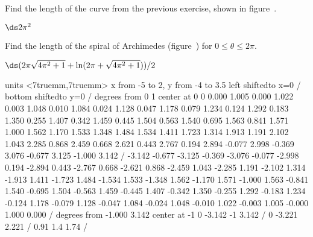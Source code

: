 \begin{exercises}
\begin{exercise} Find the length of the curve from the previous exercise,
shown in figure~.
\begin{answer} $\ds 2\pi^2$
\end{answer}\end{exercise}

\begin{exercise} Find the length of the spiral of Archimedes
(figure~) for $0\le\theta\le2\pi$.
\begin{answer} $\ds(2\pi\sqrt{4\pi^2+1}+\ln(2\pi+\sqrt{4\pi^2+1}))/2$
\end{answer}\end{exercise}

\figure
\vbox{\beginpicture
\normalgraphs
\sevenpoint
\setcoordinatesystem units <7truemm,7truemm>
\setplotarea x from -5 to 2, y from -4  to 3.5
\axis left shiftedto x=0 /
\axis bottom shiftedto y=0 /
 degrees from 0 1 center at 0 0
\setquadratic
\textRed
{} 0.000 1.005 0.000 1.022 0.003 1.048 0.010 1.084 0.024
1.128 0.047 1.178 0.079 1.234 0.124 1.292 0.183 1.350 0.255
1.407 0.342 1.459 0.445 1.504 0.563 1.540 0.695 1.563 0.841
1.571 1.000 1.562 1.170 1.533 1.348 1.484 1.534 1.411 1.723
1.314 1.913 1.191 2.102 1.043 2.285 0.868 2.459 0.668 2.621
0.443 2.767 0.194 2.894 -0.077 2.998 -0.369 3.076 -0.677 3.125
-1.000 3.142 /
 -3.142 -0.677 -3.125 -0.369 -3.076 -0.077 -2.998 0.194 -2.894
0.443 -2.767 0.668 -2.621 0.868 -2.459 1.043 -2.285 1.191 -2.102
1.314 -1.913 1.411 -1.723 1.484 -1.534 1.533 -1.348 1.562 -1.170
1.571 -1.000 1.563 -0.841 1.540 -0.695 1.504 -0.563 1.459 -0.445
1.407 -0.342 1.350 -0.255 1.292 -0.183 1.234 -0.124 1.178 -0.079
1.128 -0.047 1.084 -0.024 1.048 -0.010 1.022 -0.003 1.005 -0.000
1.000 0.000 /
 degrees from -1.000 3.142 center at -1 0
\textBlack
\setlinear\setdashes <2pt>
 -3.142 -1 3.142 /
 0 -3.221 2.221 /
 0.91 1.4 1.74 /
\endpicture}

\end{exercises}

